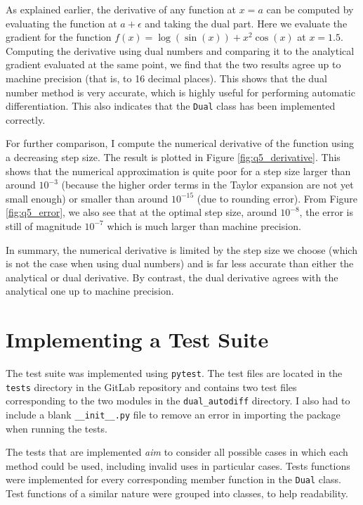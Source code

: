 \documentclass{article}
\begin{document}
As explained earlier, the derivative of any function at $x=a$ can be computed by evaluating the function at $a+\epsilon$ and taking the dual part. Here we evaluate the gradient for the function $ f(x) = \log(\sin(x)) + x^2 \cos(x) $ at $x=1.5$. Computing the derivative using dual numbers and comparing it to the analytical gradient evaluated at the same point, we find that the two results agree up to machine precision (that is, to 16 decimal places). This shows that the dual number method is very accurate, which is highly useful for performing automatic differentiation. This also indicates that the \texttt{Dual} class has been implemented correctly. 

For further comparison, I compute the numerical derivative of the function using a decreasing step size. The result is plotted in Figure \ref{fig:q5_derivative}. This shows that the numerical approximation is quite poor for a step size larger than around $10^{-3}$ (because the higher order terms in the Taylor expansion are not yet small enough) or smaller than around $10^{-15}$ (due to rounding error). From Figure \ref{fig:q5_error}, we also see that at the optimal step size, around $10^{-8}$, the error is still of magnitude $10^{-7}$ which is much larger than machine precision. 

In summary, the numerical derivative is limited by the step size we choose (which is not the case when using dual numbers) and is far less accurate than either the analytical or dual derivative. By contrast, the dual derivative agrees with the analytical one up to machine precision. 

    
\section{Implementing a Test Suite} \label{tests}
The test suite was implemented using \texttt{pytest}. The test files are located in the \texttt{tests} directory in the GitLab repository and contains two test files corresponding to the two modules in the \texttt{dual\_autodiff} directory. I also had to include a blank \texttt{\_\_init\_\_.py} file to remove an error in importing the package when running the tests.

The tests that are implemented \textit{aim} to consider all possible cases in which each method could be used, including invalid uses in particular cases. Tests functions were implemented for every corresponding member function in the \texttt{Dual} class. Test functions of a similar nature were grouped into classes, to help readability. 
\end{document}
